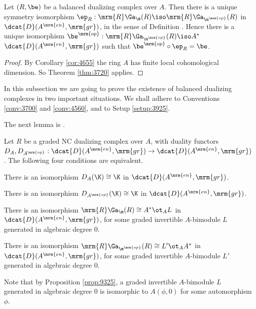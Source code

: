 \begin{cor} \label{cor:3762}
Let $(R, \be)$ be a balanced dualizing complex over $A$. Then 
there is a unique symmetry isomorphism
$\ep_{R} : \mrm{R} \Ga_{\m}(R) \iso \mrm{R} \Ga_{\m^{\mrm{op}}}(R)$
in $\dcat{D}(A^{\mrm{en}}, \mrm{gr})$, in the sense of Definition 
\tup{\ref{dfn:3779}}. Hence there is a unique isomorphism
$\be^{\mrm{op}} : \mrm{R} \Ga_{\m^{\mrm{op}}}(R) \iso A^*$ 
$\dcat{D}(A^{\mrm{en}}, \mrm{gr})$ such that 
$\be^{\mrm{op}} \circ \ep_{R} = \be$.
\end{cor}

\begin{proof}
By Corollary \ref{cor:4655} the ring $A$ has finite local
cohomological dimension. So Theorem \ref{thm:3720} applies. 
\end{proof}



\label{subsec:bal-NCDC-exis}

In this subsection we are going to prove the existence of balanced dualizing 
complexes in two important situations. We shall adhere to Conventions 
\ref{conv:3700} and \ref{conv:4560}, and to Setup \ref{setup:3925}.

The next lemma is \cite[Proposition 4.4]{Ye1}. 

\begin{lem} \label{lem:3855}
Let $R$ be a graded NC dualizing complex over $A$, with duality functors 
$D_A, D_{A^{\mrm{op}}} : \dcat{D}(A^{\mrm{en}}, \mrm{gr}) \to 
\dcat{D}(A^{\mrm{en}}, \mrm{gr})$.
The following four conditions are equivalent.  
\begin{enumerate}
 There is an isomorphism 
$D_A(\K) \cong \K$ in $\dcat{D}(A^{\mrm{en}}, \mrm{gr})$. 

 There is an isomorphism 
$D_{A^{\mrm{op}}}(\K) \cong \K$ in $\dcat{D}(A^{\mrm{en}}, \mrm{gr})$. 

 There is an isomorphism 
$\mrm{R} \Ga_{\m}(R) \cong A^* \ot_A L$
in $\dcat{D}(A^{\mrm{en}}, \mrm{gr})$, for some 
graded invertible $A$-bimodule $L$ generated in algebraic degree $0$. 

 There is an isomorphism 
$\mrm{R} \Ga_{\m^{\mrm{op}}}(R) \cong L' \ot_A A^*$
in $\dcat{D}(A^{\mrm{en}}, \mrm{gr})$, for some 
graded invertible $A$-bimodule $L'$ generated in algebraic degree $0$. 
\end{enumerate}
\end{lem}

Note that by Proposition \ref{prop:9325}, a graded invertible $A$-bimodule $L$ 
generated in algebraic degree $0$ is isomorphic to $A(\phi, 0)$ for some 
automorphism $\phi$. 

